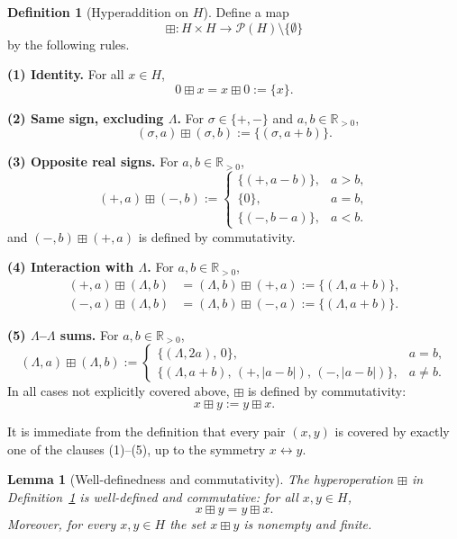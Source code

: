 \documentclass[11pt]{amsart}
\numberwithin{equation}{section}
\newtheorem{lemma}[theorem]{Lemma}
\theoremstyle{definition}
\newtheorem{definition}[theorem]{Definition}
\theoremstyle{remark}
\newcommand{\Rp}{\mathbb{R}_{>0}}
\newcommand{\Hnum}{H}                      %
\newcommand{\op}{\boxplus}                 %
\begin{document}
\begin{definition}[Hyperaddition on $\Hnum$]\label{def:H-hyperadd}
Define a map
\[
  \op : \Hnum\times\Hnum
  \longrightarrow \mathcal{P}(\Hnum)\setminus\{\emptyset\}
\]
by the following rules.

\smallskip\noindent
\textbf{(1) Identity.} For all $x\in\Hnum$,
\[
  0\op x = x\op 0 := \{x\}.
\]

\smallskip\noindent
\textbf{(2) Same sign, excluding $\Lambda$.} For $\sigma\in\{+,-\}$ and
$a,b\in\Rp$,
\[
  (\sigma,a)\op(\sigma,b)
  := \{(\sigma,a+b)\}.
\]

\smallskip\noindent
\textbf{(3) Opposite real signs.} For $a,b\in\Rp$,
\[
  (+,a)\op(-,b)
  :=
  \begin{cases}
    \{(+,a-b)\}, & a>b,\\[2pt]
    \{0\},       & a=b,\\[2pt]
    \{(-,b-a)\}, & a<b.
  \end{cases}
\]
and $(-,b)\op(+,a)$ is defined by commutativity.

\smallskip\noindent
\textbf{(4) Interaction with $\Lambda$.} For $a,b\in\Rp$,
\begin{align*}
  (+,a)\op(\Lambda,b)
  &= (\Lambda,b)\op(+,a)
   := \{(\Lambda,a+b)\},\\[2pt]
  (-,a)\op(\Lambda,b)
  &= (\Lambda,b)\op(-,a)
   := \{(\Lambda,a+b)\}.
\end{align*}

\smallskip\noindent
\textbf{(5) $\Lambda$--$\Lambda$ sums.} For $a,b\in\Rp$,
\[
  (\Lambda,a)\op(\Lambda,b)
  :=
  \begin{cases}
    \{(\Lambda,2a),\,0\}, & a=b,\\[2pt]
    \{(\Lambda,a+b),\, (+,|a-b|),\, (-,|a-b|)\}, & a\ne b.
  \end{cases}
\]
\smallskip\noindent
In all cases not explicitly covered above, $\op$ is defined by
commutativity:
\[
  x\op y := y\op x.
\]
\end{definition}

It is immediate from the definition that every pair $(x,y)$ is covered
by exactly one of the clauses (1)--(5), up to the symmetry $x\leftrightarrow y$.

\begin{lemma}[Well-definedness and commutativity]\label{lem:H-hyperadd-basic}
The hyperoperation $\op$ in Definition~\ref{def:H-hyperadd} is
well-defined and commutative: for all $x,y\in\Hnum$,
\[
  x\op y = y\op x.
\]
Moreover, for every $x,y\in\Hnum$ the set $x\op y$ is nonempty and
finite.
\end{lemma}
\end{document}
